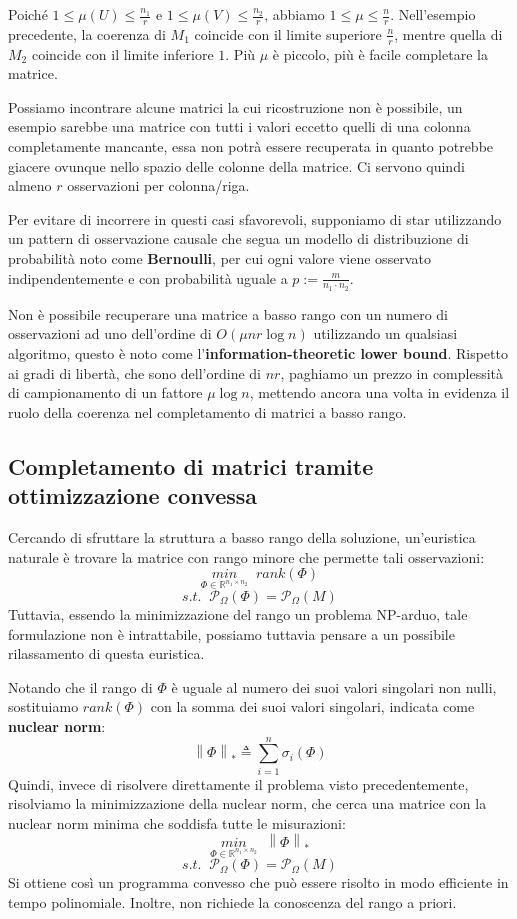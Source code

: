 \documentclass[12pt,a4paper]{report}
\newcommand{\nukenorm}[1]{\left\lVert#1\right\rVert _*}
\begin{document}
Poiché $1\leq \mu(U) \leq \frac{n_1}{r}$
e $1\leq \mu(V) \leq \frac{n_2}{r}$, abbiamo $1\leq \mu \leq \frac{n}{r}$.
Nell'esempio precedente, la coerenza di $M_1$ coincide con il limite superiore
$\frac{n}{r}$, mentre quella di $M_2$ coincide con il limite inferiore $1$.
Più $\mu$ è piccolo, più è facile completare la matrice.

Possiamo incontrare alcune matrici la cui ricostruzione non è possibile,
un esempio sarebbe una matrice con tutti i valori eccetto quelli di una colonna completamente
mancante, essa non potrà essere recuperata in quanto potrebbe giacere ovunque nello
spazio delle colonne della matrice.
Ci servono quindi almeno $r$ osservazioni per colonna/riga.

Per evitare di incorrere in questi casi sfavorevoli, supponiamo di star utilizzando
un pattern di osservazione causale che segua un modello di distribuzione di probabilità
noto come \textbf{Bernoulli}, per cui ogni valore viene osservato indipendentemente
e con probabilità uguale a $p := \frac{m}{n_1\cdot n_2}$.

Non è possibile recuperare una matrice a basso rango con un numero di osservazioni
ad uno dell'ordine di $O(\mu n r \log n)$ utilizzando un qualsiasi algoritmo,
questo è noto come l'\textbf{information-theoretic lower bound}.
Rispetto ai gradi di libertà, che sono dell'ordine di $nr$,
paghiamo un prezzo in complessità di campionamento di un fattore $\mu \log n$,
mettendo ancora una volta in evidenza il ruolo della coerenza nel completamento di matrici a basso rango.

\newpage

\subsection{Completamento di matrici tramite ottimizzazione convessa}

Cercando di sfruttare la struttura a basso rango della soluzione, un'euristica naturale
è trovare la matrice con rango minore che permette tali osservazioni:
$$ \underset{\Phi \in \mathbb{R}^{n_1 \times n_2}}{min}\;\; rank(\Phi) $$
$$ s.t. \;\;  \mathcal{P}_{\Omega}(\Phi) = \mathcal{P}_{\Omega}(M) $$ 
Tuttavia, essendo la minimizzazione del rango un problema NP-arduo,
tale formulazione non è intrattabile, possiamo tuttavia
pensare a un possibile rilassamento di questa euristica.

Notando che il rango di $\Phi$ è uguale al numero dei suoi valori singolari non nulli,
sostituiamo $rank(\Phi)$ con la somma dei suoi valori singolari, indicata come \textbf{nuclear norm}:
$$ \nukenorm{\Phi} \triangleq \sum_{i=1}^n \sigma_i(\Phi) $$
Quindi, invece di risolvere direttamente il problema visto precedentemente,
risolviamo la minimizzazione della nuclear norm, che cerca una matrice con la nuclear norm
minima che soddisfa tutte le misurazioni:
$$ \underset{\Phi \in \mathbb{R}^{n_1 \times n_2}}{min}\;\; \nukenorm{\Phi} $$
$$ s.t. \;\;  \mathcal{P}_{\Omega}(\Phi) = \mathcal{P}_{\Omega}(M) $$ 
Si ottiene così un programma convesso che può
essere risolto in modo efficiente in tempo polinomiale.
Inoltre, non richiede la conoscenza
del rango a priori.
\end{document}

